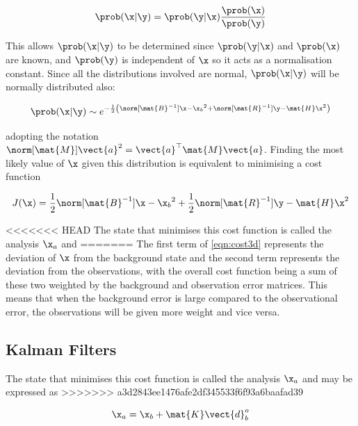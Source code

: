 \begin{equation}
    \prob(\x|\y) = \prob(\y|\x) \frac{\prob(\x)}{\prob(\y)}
\end{equation}

This allows $\prob(\x|\y)$ to be determined since $\prob(\y|\x)$ and $\prob(\x)$ are known, and $\prob(\y)$ is independent of $\x$ so it acts as a normalisation constant. Since all the distributions involved are normal, $\prob(\x|\y)$ will be normally distributed also:

\begin{equation}
    \prob(\x|\y) \sim e^{-\frac 1 2 \left( \norm[\mat{B}^{-1}]{\x - \x_b}^2 + \norm[\mat{R}^{-1}]{\y - \mat{H}\x}^2\right)}
\end{equation}

adopting the notation $\norm[\mat{M}]{\vect{a}}^2 = \vect{a}^\top \mat{M} \vect{a}$. Finding the most likely value of $\x$ given this distribution is equivalent to minimising a cost function

\begin{equation}
    J(\x) = \frac 1 2 \norm[\mat{B}^{-1}]{\x - \x_b}^2 + \frac 1 2 \norm[\mat{R}^{-1}]{\y - \mat{H}\x}^2
    \label{eqn:cost3d}
\end{equation}

<<<<<<< HEAD
The state that minimises this cost function is called the analysis $\x_a$ and 
=======
The first term of \ref{eqn:cost3d} represents the deviation of $\x$ from the background state and the second term represents the deviation from the observations, with the overall cost function being a sum of these two weighted by the background and observation error matrices. This means that when the background error is large compared to the observational error, the observations will be given more weight and vice versa.

\subsection{Kalman Filters}

The state that minimises this cost function is called the analysis $\x_a$ and may be expressed as
>>>>>>> a3d2843ee1476afe2df345533f6f93a6baafad39

\begin{equation}
    \x_a = \x_b + \mat{K}\vect{d}^o_b
\label{eqn:analysisupdate}
\end{equation}

